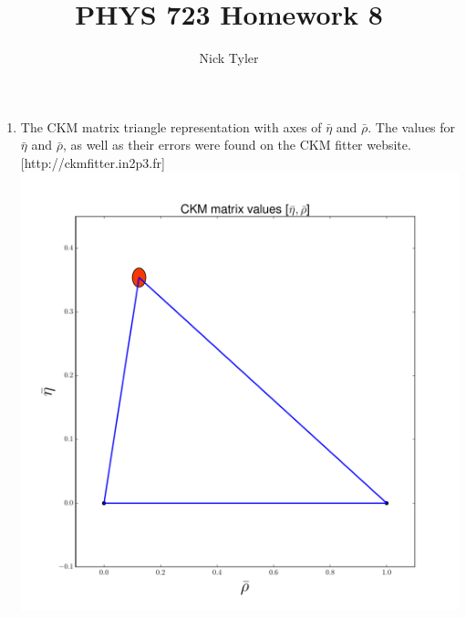 \documentclass[pdftex]{article}
\title{PHYS 723 Homework 8}
\author{Nick Tyler}
\date{}
\begin{document}
\captionsetup[figure]{aboveskip=-15pt}
\captionsetup[figure]{belowskip=15pt}
\maketitle
\begin{enumerate}
	\item  The CKM matrix triangle representation with axes of $\bar{\eta}$ and $\bar{\rho}$.  
	The values for $\bar{\eta}$ and $\bar{\rho}$, as well as their errors were found on the CKM fitter website. 
	[http://ckmfitter.in2p3.fr] \\
	\includegraphics[scale=0.4]{CKMTri.pdf}\\



\end{enumerate}
\end{document}
